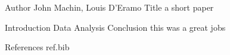 Author John Machin, Louis D'Eramo
Title a short paper

Introduction
Data
Analysis
Conclusion this was a great jobs


References 
ref.bib